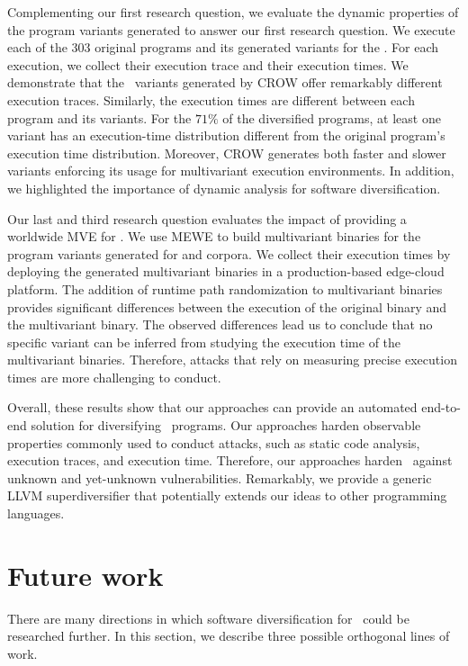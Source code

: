 Complementing our first research question, we evaluate the dynamic properties of the program variants generated to answer our first research question.
We execute each of the 303 original programs and its generated variants for the \corpusrosetta.
For each execution, we collect their execution trace and their execution times.
We demonstrate that the \wasm\ variants generated by CROW offer remarkably different execution traces.
Similarly, the execution times are different between each program and its variants.
For the $71\%$ of the diversified programs, at least one variant has an execution-time distribution different from the original program's execution time distribution.
Moreover, CROW generates both faster and slower variants enforcing its usage for multivariant execution environments.
In addition, we highlighted the importance of dynamic analysis for software diversification. 

Our last and third research question evaluates the impact of providing a worldwide MVE for \wasm.
We use MEWE to build multivariant binaries for the program variants generated for \corpussodium and \corpusqrcode corpora.
We collect their execution times by deploying the generated multivariant binaries in a production-based edge-cloud platform.
The addition of runtime path randomization to multivariant binaries provides significant differences between the execution of the original binary and the multivariant binary.
The observed differences lead us to conclude that no specific variant can be inferred from studying the execution time of the multivariant binaries. Therefore, attacks that rely on measuring precise execution times are more challenging to conduct.


Overall, these results show that our approaches can provide an automated end-to-end solution for diversifying \wasm\ programs. 
Our approaches harden observable properties commonly used to conduct attacks, such as static code analysis, execution traces, and execution time.
Therefore, our approaches harden \wasm\ against unknown and yet-unknown vulnerabilities.
Remarkably, we provide a generic LLVM superdiversifier that potentially extends our ideas to other programming languages.


\section{Future work}
\label{future_work}

There are many directions in which software diversification for \wasm\ could be researched further.
In this section, we describe three possible orthogonal lines of work.

